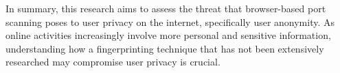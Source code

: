 In summary, this research aims to assess the threat that browser-based port scanning poses to user privacy on the internet, specifically user anonymity.
As online activities increasingly involve more personal and sensitive information, understanding how a fingerprinting technique that has not been extensively researched may compromise user privacy is crucial.







